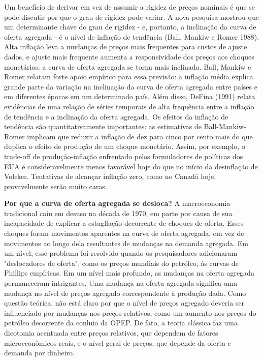 \documentclass[a4paper,12pt]{article}[abntex2]
\begin{document}
Um benefício de derivar em vez de assumir a rigidez de preços nominais é que se pode discutir por que o grau de rigidez pode variar. A nova pesquisa mostrou que um determinante chave do grau de rigidez - e, portanto, a inclinação da curva de oferta agregada - é o nível de inflação de tendência (Ball, Mankiw e Romer 1988). Alta inflação leva a mudanças de preços mais frequentes para custos de ajuste dados, e ajuste mais frequente aumenta a responsividade dos preços aos choques monetários: a curva de oferta agregada se torna mais inclinada. Ball, Mankiw e Romer relatam forte apoio empírico para essa previsão: a inflação média explica grande parte da variação na inclinação da curva de oferta agregada entre países e em diferentes épocas em um determinado país. Além disso, DeFina (1991) relata evidências de uma relação de séries temporais de alta frequência entre a inflação de tendência e a inclinação da oferta agregada. Os efeitos da inflação de tendência são quantitativamente importantes: as estimativas de Ball-Mankiw-Romer implicam que reduzir a inflação de dez para cinco por cento mais do que duplica o efeito de produção de um choque monetário. Assim, por exemplo, o trade-off de produção-inflação enfrentado pelos formuladores de políticas dos EUA é consideravelmente menos favorável hoje do que no início da desinflação de Volcker. Tentativas de alcançar inflação zero, como no Canadá hoje, provavelmente serão muito caras.

\textbf{Por que a curva de oferta agregada se desloca?}
A macroeconomia tradicional caiu em desuso na década de 1970, em parte por causa de sua incapacidade de explicar a estagflação decorrente de choques de oferta. Esses choques foram movimentos aparentes na curva de oferta agregada, em vez de movimentos ao longo dela resultantes de mudanças na demanda agregada. Em um nível, esse problema foi resolvido quando os pesquisadores adicionaram "deslocadores de oferta", como os preços mundiais do petróleo, às curvas de Phillips empíricas. Em um nível mais profundo, as mudanças na oferta agregada permaneceram intrigantes. Uma mudança na oferta agregada significa uma mudança no nível de preços agregado correspondente à produção dada. Como questão teórica, não está claro por que o nível de preços agregado deveria ser influenciado por mudanças nos preços relativos, como um aumento nos preços do petróleo decorrente da conluio da OPEP. De fato, a teoria clássica faz uma dicotomia acentuada entre preços relativos, que dependem de fatores microeconômicos reais, e o nível geral de preços, que depende da oferta e demanda por dinheiro.
\end{document}
